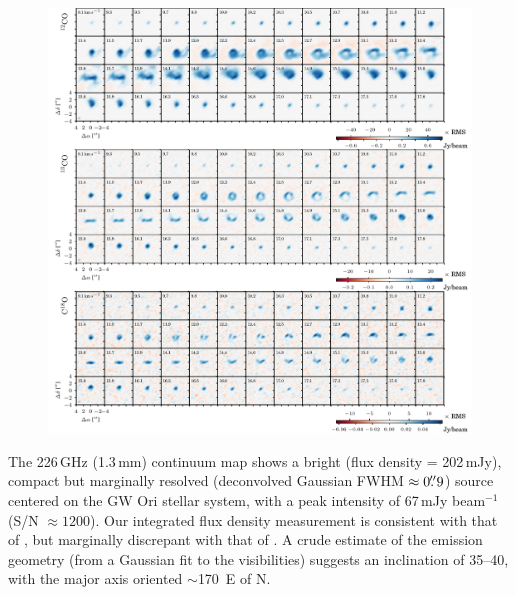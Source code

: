 \documentclass[twocolumn]{aastex61}
\begin{document}
\begin{figure}[ht!]
\begin{center}
  \includegraphics{chmaps_all.pdf}
  \end{center}
\end{figure}

The 226\,GHz (1.3\,mm) continuum map shows a bright (flux density = 202\,mJy), compact but marginally resolved (deconvolved Gaussian FWHM $\approx 0\mbox{$.\!\!^{\prime\prime}$}9$) source centered on the GW Ori stellar system, with a peak intensity of 67\,mJy beam$^{-1}$ (S/N $\approx 1200$). Our integrated flux density measurement is consistent with that of \citet[$255 \pm 60$\,mJy]{mathieu95},  but marginally discrepant with that of \citet[$320 \pm 64$\,mJy]{fang17}. A crude estimate of the emission geometry (from a Gaussian fit to the visibilities) suggests an inclination of 35--40\degr, with the major axis oriented $\sim$170\degr\ E of N.
\end{document}
